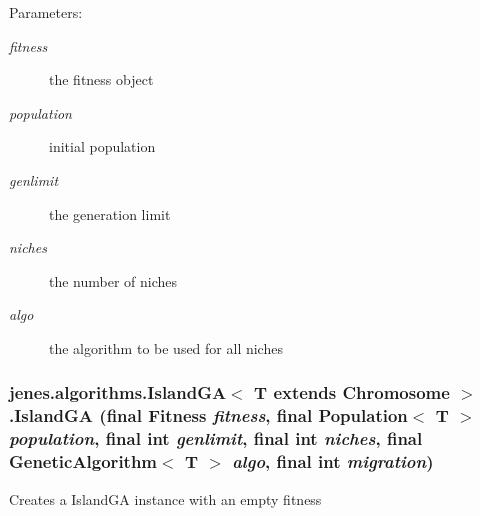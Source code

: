 \begin{Desc}
\item[Parameters:]
\begin{description}
\item[{\em fitness}]the fitness object \item[{\em population}]initial population \item[{\em genlimit}]the generation limit \item[{\em niches}]the number of niches \item[{\em algo}]the algorithm to be used for all niches \end{description}
\end{Desc}
\hypertarget{classjenes_1_1algorithms_1_1_island_g_a_3_01_t_01extends_01_chromosome_01_4_8cf783104bfb991a4a0db319cf2403c4}{
\subsubsection[IslandGA]{\setlength{\rightskip}{0pt plus 5cm}jenes.algorithms.IslandGA$<$ T extends Chromosome $>$.IslandGA (final Fitness {\em fitness}, \/  final Population$<$ T $>$ {\em population}, \/  final int {\em genlimit}, \/  final int {\em niches}, \/  final GeneticAlgorithm$<$ T $>$ {\em algo}, \/  final int {\em migration})}}
\label{classjenes_1_1algorithms_1_1_island_g_a_3_01_t_01extends_01_chromosome_01_4_8cf783104bfb991a4a0db319cf2403c4}


Creates a IslandGA instance with an empty fitness

